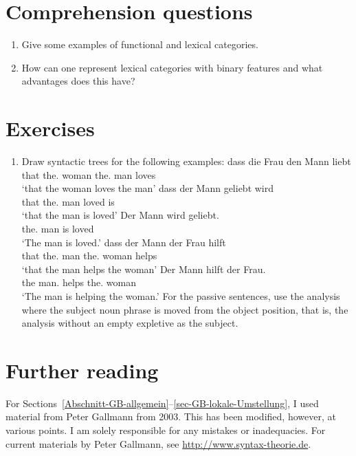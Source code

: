 \section*{Comprehension questions}

\begin{enumerate}
\item Give some examples of functional and lexical categories.
\item How can one represent lexical categories with binary features and what advantages does this have?
\end{enumerate}

\section*{Exercises}


\begin{enumerate}
\item Draw syntactic trees for the following examples:
\eal
\ex 
\gll dass die Frau den Mann liebt\\
     that the.\nom{} woman the.\acc{} man loves\\
\glt `that the woman loves the man'
\ex 
\gll dass der Mann geliebt wird\\
     that the.\nom{} man loved is\\
\glt `that the man is loved'
\ex 
\gll Der Mann wird geliebt.\\
     the.\nom{} man is loved\\
\glt `The man is loved.'
\ex 
\gll dass der Mann der Frau hilft\\
     that the.\nom{} man the.\dat{} woman helps\\
\glt `that the man helps the woman'
\ex 
\gll Der Mann hilft der Frau.\\
     the man.\nom{} helps the.\dat{} woman\\
\glt `The man is helping the woman.'
\zl
For the passive sentences, use the analysis where the subject noun phrase is moved from the object position, that is, the analysis
without an empty expletive as the subject.
\end{enumerate}



\section*{Further reading}

For Sections~\ref{Abschnitt-GB-allgemein}--\ref{sec-GB-lokale-Umstellung}, I used material from Peter Gallmann
from 2003. This has been modified, however, at various points. I am solely responsible for any mistakes or inadequacies.
For current materials by Peter Gallmann, see \url{http://www.syntax-theorie.de}. 

